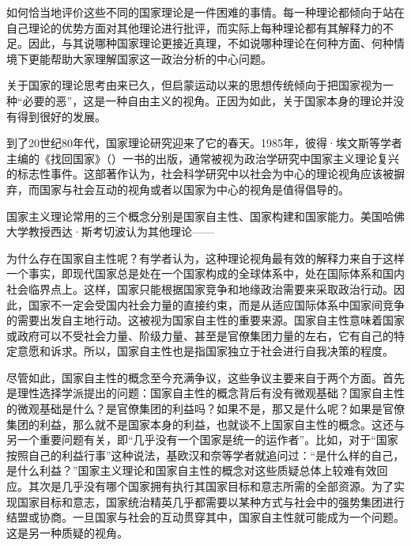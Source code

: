 如何恰当地评价这些不同的国家理论是一件困难的事情。每一种理论都倾向于站在自己理论的优势方面对其他理论进行批评，而实际上每种理论都有其解释力的不足。因此，与其说哪种国家理论更接近真理，不如说哪种理论在何种方面、何种情境下更能帮助大家理解国家这一政治分析的中心问题。


关于国家的理论思考由来已久，但启蒙运动以来的思想传统倾向于把国家视为一种“必要的恶”，这是一种自由主义的视角。正因为如此，关于国家本身的理论并没有得到很好的发展。

到了20世纪80年代，国家理论研究迎来了它的春天。1985年，彼得·埃文斯等学者主编的《找回国家》（）一书的出版，通常被视为政治学研究中国家主义理论复兴的标志性事件。这部著作认为，社会科学研究中以社会为中心的理论视角应该被摒弃，而国家与社会互动的视角或者以国家为中心的视角是值得倡导的。

国家主义理论常用的三个概念分别是国家自主性、国家构建和国家能力。美国哈佛大学教授西达·斯考切波认为其他理论——


为什么存在国家自主性呢？有学者认为，这种理论视角最有效的解释力来自于这样一个事实，即现代国家总是处在一个国家构成的全球体系中，处在国际体系和国内社会临界点上。这样，国家只能根据国家竞争和地缘政治需要来采取政治行动。因此，国家不一定会受国内社会力量的直接约束，而是从适应国际体系中国家间竞争的需要出发自主地行动。这被视为国家自主性的重要来源。国家自主性意味着国家或政府可以不受社会力量、阶级力量、甚至是官僚集团力量的左右，它有自己的特定意愿和诉求。所以，国家自主性也是指国家独立于社会进行自我决策的程度。

尽管如此，国家自主性的概念至今充满争议，这些争议主要来自于两个方面。首先是理性选择学派提出的问题：国家自主性的概念背后有没有微观基础？国家自主性的微观基础是什么？是官僚集团的利益吗？如果不是，那又是什么呢？如果是官僚集团的利益，那么就不是国家本身的利益，也就谈不上国家自主性的概念。这还与另一个重要问题有关，即“几乎没有一个国家是统一的运作者”。比如，对于“国家按照自己的利益行事”这种说法，基欧汉和奈等学者就追问过：“是什么样的自己，是什么利益？”国家主义理论和国家自主性的概念对这些质疑总体上较难有效回应。其次是几乎没有哪个国家拥有执行其国家目标和意志所需的全部资源。为了实现国家目标和意志，国家统治精英几乎都需要以某种方式与社会中的强势集团进行结盟或协商。一旦国家与社会的互动贯穿其中，国家自主性就可能成为一个问题。这是另一种质疑的视角。

